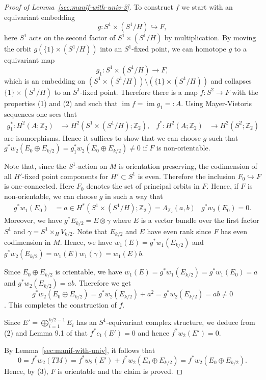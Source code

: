 \documentclass[a4paper, 11pt]{amsart}
\theoremstyle{definition}
\theoremstyle{remark}
\numberwithin{equation}{section}
\DeclareMathOperator{\image}{im}
\begin{document}
\begin{proof}[Proof of Lemma~\ref{sec:manif-with-univ-3}]
To construct \(f\) we start with an equivariant embedding
\[g:S^1\times (S^1/H)\hookrightarrow F,\]
here \(S^1\) acts on the second factor of \(S^1\times (S^1/H)\) by multiplication.
By moving the orbit \(g(\{1\}\times (S^1/H))\) into an \(S^1\)-fixed point, we can homotope \(g\) to a equivariant map
\[g_1:S^1\times (S^1/H)\rightarrow F,\]
which is an embedding on \((S^1\times (S^1/H))\setminus (\{1\}\times (S^1/H))\) and collapses \(\{1\}\times (S^1/H)\) to an \(S^1\)-fixed point.
Therefore there is a map \(f:S^2\rightarrow F\) with the properties (1) and (2) and such that \(\image f=\image g_1=:A\).
Using Mayer-Vietoris sequences one sees that
\begin{align*}
  g_1^*:H^2(A;\mathbb{Z}_2)&\rightarrow H^2(S^1\times (S^1/H);\mathbb{Z}_2),& f^*:H^2(A;\mathbb{Z}_2)&\rightarrow H^2(S^2;\mathbb{Z}_2)
\end{align*}
are isomorphisms.
Hence it suffices to show that we can choose \(g\) such that \(g^*w_2(E_0\oplus E_{k/2})=g_1^*w_2(E_0\oplus E_{k/2})\neq 0\) if \(F\) is non-orientable.

Note that, since the \(S^1\)-action on \(M\) is orientation preserving, the codimension of all \(H'\)-fixed point components for \(H'\subset S^1\) is even.
Therefore the inclusion \(F_0\hookrightarrow F\) is one-connected.
Here \(F_0\) denotes the set of principal orbits in \(F\).
Hence, if \(F\) is non-orientable, we can choose \(g\) in such a way that
\begin{align*}
  g^*w_1(E_0)&=a\in H^*(S^1\times (S^1/H);\mathbb{Z}_2)=\Lambda_{\mathbb{Z}_2}(a,b)&
                                                                                     g^*w_2(E_0)=0.
\end{align*}
Moreover, we have \(g^*E_{k/2}=E\otimes \gamma\) where \(E\) is a vector bundle over the first factor \(S^1\) and \(\gamma=S^1\times_HV_{k/2}\).
Note that \(E_{k/2}\) and \(E\) have even rank since \(F\) has even codimension in \(M\).
Hence, we have \(w_1(E)=g^*w_1(E_{k/2})\) and \(g^*w_2(E_{k/2})=w_1(E)w_1(\gamma)=w_1(E)b\).

Since \(E_0\oplus E_{k/2}\) is orientable, we have \(w_1(E)=g^*w_1(E_{k/2})=g^*w_1(E_0)=a\) and \(g^*w_2(E_{k/2})=ab\).
Therefore we get \[g^*w_2(E_0\oplus E_{k/2})=g^*w_2(E_{k/2})+a^2=g^*w_2(E_{k/2})=ab\neq 0\].
This completes the construction of \(f\).

Since \(E'=\bigoplus_{i=1}^{k/2-1}E_i\) has an \(S^1\)-equivariant complex structure, we deduce from (2) and Lemma 9.1 of \cite{MR954493} that \(f^*c_1(E')=0\) and hence \(f^*w_2(E')=0\).

By Lemma~\ref{sec:manif-with-univ}, it follows that
\[0=f^*w_2(TM)=f^*w_2(E')+f^*w_2(E_0\oplus E_{k/2})=f^*w_2(E_0\oplus E_{k/2}).\]
Hence, by (3), \(F\) is orientable and the claim is proved.
\end{proof}
\end{document}
